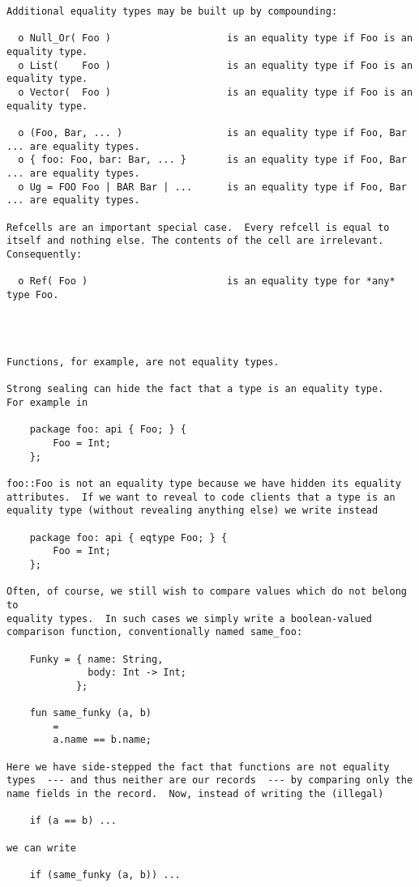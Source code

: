\begin{verbatim}
Additional equality types may be built up by compounding: 

  o Null_Or( Foo )                    is an equality type if Foo is an equality type.  
  o List(    Foo )                    is an equality type if Foo is an equality type.  
  o Vector(  Foo )                    is an equality type if Foo is an equality type. 

  o (Foo, Bar, ... )                  is an equality type if Foo, Bar ... are equality types. 
  o { foo: Foo, bar: Bar, ... }       is an equality type if Foo, Bar ... are equality types. 
  o Ug = FOO Foo | BAR Bar | ...      is an equality type if Foo, Bar ... are equality types. 

Refcells are an important special case.  Every refcell is equal to 
itself and nothing else. The contents of the cell are irrelevant. 
Consequently: 

  o Ref( Foo )                        is an equality type for *any* type Foo. 




Functions, for example, are not equality types. 

Strong sealing can hide the fact that a type is an equality type. 
For example in 

    package foo: api { Foo; } { 
        Foo = Int; 
    }; 

foo::Foo is not an equality type because we have hidden its equality 
attributes.  If we want to reveal to code clients that a type is an 
equality type (without revealing anything else) we write instead 

    package foo: api { eqtype Foo; } { 
        Foo = Int; 
    }; 

Often, of course, we still wish to compare values which do not belong to 
equality types.  In such cases we simply write a boolean-valued 
comparison function, conventionally named same_foo: 

    Funky = { name: String, 
              body: Int -> Int; 
            }; 

    fun same_funky (a, b) 
        = 
        a.name == b.name; 

Here we have side-stepped the fact that functions are not equality 
types  --- and thus neither are our records  --- by comparing only the 
name fields in the record.  Now, instead of writing the (illegal) 

    if (a == b) ... 

we can write 

    if (same_funky (a, b)) ... 


\end{verbatim}
